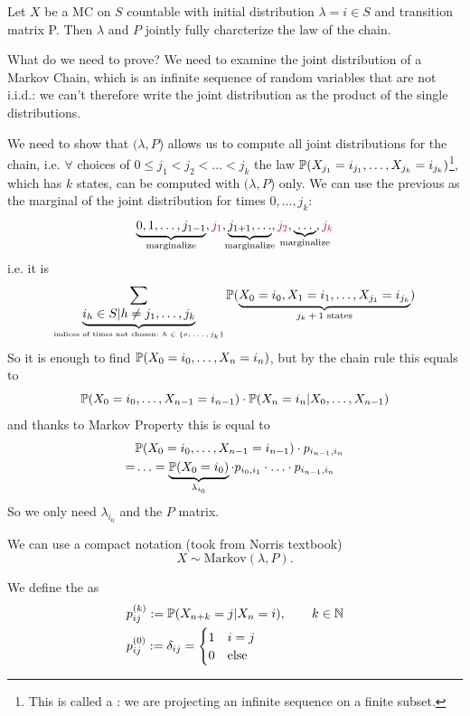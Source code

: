 \documentclass{article}
\begin{document}
\begin{proposition}
    Let $X$  be a MC on $S$ countable with initial distribution $\lambda=i \in S$ and transition matrix P. Then $\lambda$ and $P$ jointly fully charcterize the law of the chain. 
\end{proposition}
\begin{proof2}
    What do we need to prove? We need to examine the joint distribution of a Markov Chain, which is an infinite sequence of random variables that are not i.i.d.: we can't therefore write the joint distribution as the product of the single distributions.

    We need to show that $(\lambda, P$) allows us to compute all joint distributions for the chain, i.e. $\forall$ choices of $0\leqslant j_1 < j_2 < \ldots < j_k$ the law $\mathbb{P}(X_{j_1}=i_{j_1}, \ldots, X_{j_k}=i_{j_k})$\footnote{This is called a : we are projecting an infinite sequence on a finite subset.}, which has $k$ states, can be computed with $(\lambda, P$) only. We can use the previous as the marginal of the joint distribution for times $0, \ldots, j_k$:
    \[
    \underbrace{0,1,\dots,j_{1-1}}_{\mathclap{\text{marginalize}}},\textcolor{RedViolet}{j_1},\underbrace{j_{1+1},\ldots}_{\mathclap{\text{marginalize}}},\textcolor{RedViolet}{j_2},\underbrace{\ldots}_{\mathclap{\text{marginalize}}},\textcolor{RedViolet}{j_k}
    \]
    i.e. it is
    \[
    \sum_{\underbrace{i_h\in S | h \neq j_1,\ldots,j_k}_\text{indices of times not chosen: $h \in \{o, \ldots, j_k\}$}} \mathbb{P}(\underbrace{X_0=i_0, X_1=i_1,\ldots,X_{j_1}=i_{j_k}}_\text{$j_k + 1$ states})
    \]
    So it is enough to find $\mathbb{P}(X_0=i_0,\ldots,X_n=i_n)$, but by the chain rule this equals to 
    \[\mathbb{P}(X_0=i_0,\ldots,X_{n-1}=i_{n-1}) \cdot \mathbb{P}(X_n=i_n|X_0,\ldots,X_{n-1})\]
    and thanks to Markov Property this is equal to
    \begin{align*}
           &\mathbb{P}(X_0=i_0,\ldots,X_{n-1}=i_{n-1}) \cdot p_{i_{n-1},i_n}\\
           =&\ldots=\underbrace{\mathbb{P}(X_0=i_0)}_{\lambda_{i_0}}\cdot       p_{i_0,i_1}\cdot\ldots\cdot p_{i_{n-1},i_n}
    \end{align*}
    So we only need $\lambda_{i_0}$ and the $P$ matrix.
\end{proof2}

We can use a compact notation (took from Norris textbook)
\[X \sim \text{Markov}(\lambda,P).\]

\begin{definition}
  We define the  as
\begin{align*}
    &p_{ij}^{(k)} := \mathbb{P}(X_{n+k}=j|X_n=i), \qquad k \in \mathbb{N}\\
    &p_{ij}^{(0)} := \delta_{ij} = \begin{cases}
        1 & i=j\\
        0 & \text{else}
    \end{cases}
\end{align*}
\end{definition}
\end{document}
